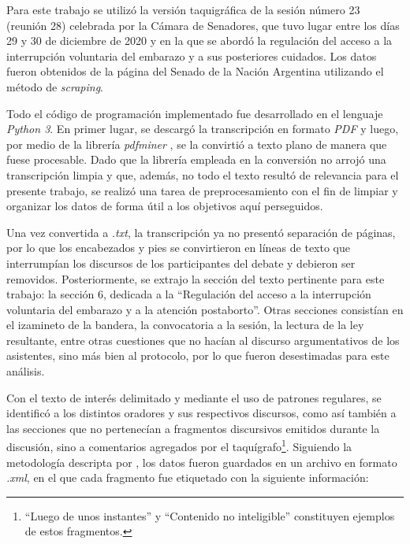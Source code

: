 Para este trabajo se utiliz\'o la versi\'on {taquigr\'afica} de la sesi\'on n\'umero
23 (reuni\'on 28) celebrada por la {C\'amara} de Senadores, que tuvo lugar entre los d\'ias
29 y 30 de diciembre de 2020 y en la que se abord\'o la
regulaci\'on del acceso a la interrupci\'on voluntaria del embarazo y a sus
posteriores cuidados. Los datos fueron obtenidos de la {p\'agina} del Senado de la Naci\'on
Argentina \citep{senado@sesion}
utilizando el m\'etodo de \textit{scraping}.\par
Todo el c\'odigo de programaci\'on implementado fue desarrollado en el lenguaje
\textit{Python 3}. En primer lugar, se descarg\'o la transcripci\'on en formato \textit{PDF} y luego, por
medio de la librer\'ia \textit{pdfminer} \citet{pdfminer@doc},
se la convirti\'o a texto plano de manera que fuese procesable. Dado que la librer\'ia
empleada en la conversi\'on no arroj\'o una transcripci\'on limpia y que, {adem\'as}, no todo el texto
result\'o de relevancia para el presente trabajo, se {realiz\'o} una tarea de
preprocesamiento con el fin de limpiar y organizar los datos de forma \'util a los
objetivos aqu\'i perseguidos.\par
Una vez convertida a \textit{.txt}, la transcripci\'on ya no present\'o separaci\'on de
{p\'aginas}, por lo que los encabezados y pies se convirtieron en l\'ineas de texto que
interrump\'ian los discursos de los participantes del debate y debieron
ser removidos.
Posteriormente, se extrajo la secci\'on del texto pertinente para este trabajo:
la secci\'on 6, dedicada a la ``Regulaci\'on  del  acceso  a  la  interrupci\'on
voluntaria  del  embarazo  y  a  la atenci\'on postaborto''. Otras secciones consist\'ian
en el izamineto de la bandera, la convocatoria a la sesi\'on, la lectura de la ley
resultante, entre otras cuestiones que no hac\'ian al discurso argumentativos de los
asistentes, sino {m\'as} bien al protocolo, por lo que fueron desestimadas
para este {an\'alisis}.\par
Con el texto de inter\'es delimitado y mediante el uso de patrones regulares, se
identific\'o a los distintos oradores y sus respectivos discursos, como as\'i tambi\'en
a las secciones que no pertenec\'ian a fragmentos discursivos emitidos durante la
discusi\'on, sino a comentarios agregados por el taqu\'igrafo\footnote{``Luego de unos
instantes'' y ``Contenido no inteligible'' constituyen ejemplos de estos
fragmentos.}. Siguiendo la metodolog\'ia descripta por \cite{monroe2008fightin},
los datos fueron guardados en un archivo en formato \textit{.xml}, en el que
cada fragmento fue etiquetado con la siguiente informaci\'on:
